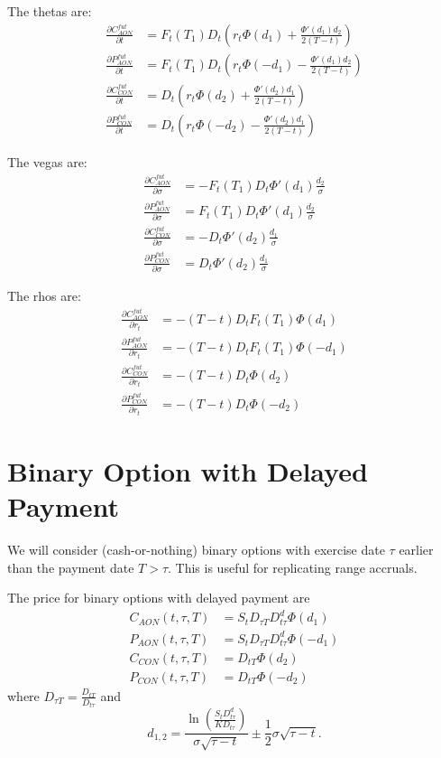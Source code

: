 The thetas are:
\begin{align}
	\frac{\partial C_{AON}^{fut}}{\partial t}  
	  &= F_t(T_1) D_t 
	     \left( r_t \Phi(d_1) + \frac{\Phi'(d_1) d_2}{2(T-t)} \right)   \\
	\frac{\partial P_{AON}^{fut}}{\partial t}  
	  &= F_t(T_1) D_t 
	     \left( r_t \Phi(-d_1) - \frac{\Phi'(d_1) d_2}{2(T-t)} \right)   \\
	\frac{\partial C_{CON}^{fut}}{\partial t}  
	  &= D_t 
	     \left( r_t \Phi(d_2) + \frac{\Phi'(d_2) d_1}{2(T-t)} \right)   \\
	\frac{\partial P_{CON}^{fut}}{\partial t}  
	  &= D_t 
	     \left( r_t \Phi(-d_2) - \frac{\Phi'(d_2) d_1}{2(T-t)} \right)   
\end{align}

The vegas are:
\begin{align}
	\frac{\partial C_{AON}^{fut}}{\partial \sigma}  
	  &= - F_t(T_1) D_t \Phi'(d_1) \frac{d_2}{\sigma}    \\
	\frac{\partial P_{AON}^{fut}}{\partial \sigma}  
	  &=  F_t(T_1) D_t \Phi'(d_1) \frac{d_2}{\sigma}    \\
	\frac{\partial C_{CON}^{fut}}{\partial \sigma}  
	  &=  - D_t \Phi'(d_2) \frac{d_1}{\sigma}    \\
	\frac{\partial P_{CON}^{fut}}{\partial \sigma}  
	  &=  D_t \Phi'(d_2) \frac{d_1}{\sigma} 
\end{align}

The rhos are:
\begin{align}
	\frac{\partial C_{AON}^{fut}}{\partial r_t}  
    &=  - (T-t) D_t F_t(T_1) \Phi(d_1)  \\
	\frac{\partial P_{AON}^{fut}}{\partial r_t}  
    &=  - (T-t) D_t F_t(T_1) \Phi(-d_1)  \\
	\frac{\partial C_{CON}^{fut}}{\partial r_t}  &=  - (T-t) D_t \Phi(d_2)  \\
	\frac{\partial P_{CON}^{fut}}{\partial r_t}  &=  - (T-t) D_t \Phi(-d_2)  
\end{align}

\section{Binary Option with Delayed Payment}
We will consider (cash-or-nothing) binary options with exercise date $\tau$ 
earlier than the payment date $T>\tau$. This is useful for replicating range 
accruals. 

The price for binary options with delayed payment are 
\begin{align}
	C_{AON}(t,\tau,T) &= S_t D_{\tau T} D_{t\tau}^d \Phi(d_1)   \\
	P_{AON}(t,\tau,T) &= S_t D_{\tau T} D_{t\tau}^d \Phi(-d_1)  \\
	C_{CON}(t,\tau,T) &= D_{tT} \Phi(d_2)         \\
	P_{CON}(t,\tau,T) &= D_{tT} \Phi(-d_2)        
\end{align}
where $D_{\tau T}=\frac{D_{tT}}{D_{t\tau}}$ and
\[
	d_{1,2}=\frac{\ln\left( \frac{S_t D_{t\tau}^d}{K D_{t\tau}}\right)}{\sigma\sqrt{\tau-t}}
          \pm \frac{1}{2} \sigma\sqrt{\tau -t}.
\]

